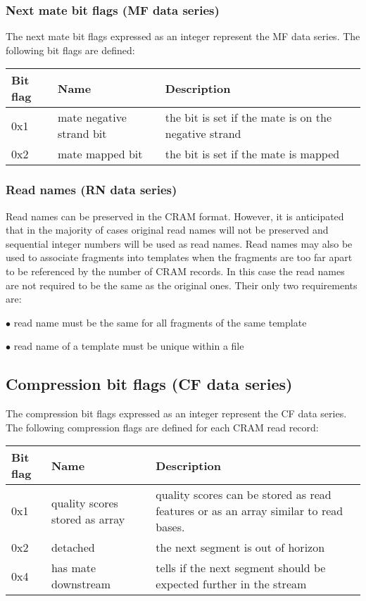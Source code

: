 \documentclass[a4paper]{article}
\begin{document}
\subsubsection*{}

\subsubsection*{Next mate bit flags (MF data series)}

The next mate bit flags expressed as an integer represent the MF data series. The 
following bit flags are defined:

\begin{tabular}{|>{\raggedright}p{47pt}|>{\raggedright}p{134pt}|>{\raggedright}p{250pt}|}
\hline
\textbf{Bit flag} & \textbf{Name} & \textbf{Description}\tabularnewline
\hline
0x1 & mate negative strand bit & the bit is set if the mate is on the negative 
strand\tabularnewline
\hline
0x2 & mate mapped bit & the bit is set if the mate is mapped\tabularnewline
\hline
\end{tabular}

\subsubsection*{Read names (RN data series)}

Read names can be preserved in the CRAM format. However, it is anticipated that 
in the majority of cases original read names will not be preserved and sequential 
integer numbers will be used as read names. Read names may also be used to associate 
fragments into templates when the fragments are too far apart to be referenced 
by the number of CRAM records. In this case the read names are not required to 
be the same as the original ones. Their only two requirements are:

$\bullet$ read name must be the same for all fragments of the same template

$\bullet$ read name of a template must be unique within a file

\subsection{\textbf{Compression bit flags (CF data series)}}

The compression bit flags expressed as an integer represent the CF data series. 
The following compression flags are defined for each CRAM read record:

\begin{tabular}{|>{\raggedright}p{39pt}|>{\raggedright}p{150pt}|>{\raggedright}p{242pt}|}
\hline
\textbf{Bit flag} & \textbf{Name} & \textbf{Description}\tabularnewline
\hline
0x1 & quality scores stored as array & quality scores can be stored as read features 
or as an array similar to read bases.\tabularnewline
\hline
0x2 & detached & the next segment is out of horizon\tabularnewline
\hline
0x4 & has mate downstream & tells if the next segment should be expected further 
in the stream\tabularnewline
\hline
\end{tabular}
\end{document}
